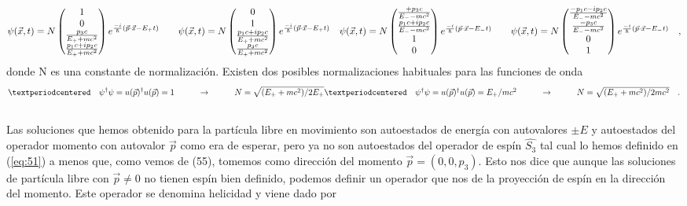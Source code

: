 \documentclass[11pt,letterpaper]{article}     %
\begin{document}
\begin{equation} \label{eq:57}
\psi(\vec{x},t)=N\begin{pmatrix}
1 \\ 0 \\ \frac{p_3 c}{E_+ + mc^2} \\ \frac{p_1 c + ip_2 c}{E_+ + mc^2}
\end{pmatrix} e^{\frac{-i}{\hbar}(\vec{p}\cdot \vec{x}- E_+ t)} \qquad
\psi(\vec{x},t)=N\begin{pmatrix}
0 \\ 1  \\ \frac{p_1 c + ip_2 c}{E_+ + mc^2}\\ \frac{p_3 c}{E_+ + mc^2}
\end{pmatrix} e^{\frac{-i}{\hbar}(\vec{p} \cdot \vec{x}- E_+ t)} \quad $$\\$$
\psi(\vec{x},t)=N\begin{pmatrix}
\frac{+p_3 c}{E_- - mc^2} \\ \frac{p_1 c+ip_2 c}{E_- - mc^2}  \\ 1\\ 0
\end{pmatrix} e^{\frac{-i}{\hbar}(\vec{p} \cdot \vec{x} - E_- t)} \qquad
\psi(\vec{x},t)=N\begin{pmatrix}
\frac{-p_1 c- ip_2 c}{E_- - mc^2}\\ \frac{-p_3 c}{E_- - mc^2} \\ 0 \\ 1  
\end{pmatrix} e^{\frac{-i}{\hbar}(\vec{p} \cdot \vec{x} - E_- t)} \quad ,
\end{equation}
donde N es una constante de normalización. Existen dos posibles normalizaciones habituales para las funciones de onda \\
\begin{equation} \label{eq:58}
· \quad \psi^\dagger \psi =u(\vec{p})^\dagger u(\vec{p})=1 \hspace{1cm} \rightarrow \hspace{1cm} N=\sqrt{(E_+ + mc^2)/2E_+} $$\\$$
· \quad \psi^\dagger \psi = u(\vec{p})^\dagger u(\vec{p})= E_+ /mc^2 \hspace{1cm} \rightarrow \hspace{1cm} N=\sqrt{(E_+ + mc^2)/ 2mc^2} \quad.
\end{equation} \\
Las soluciones que hemos obtenido para la partícula libre en movimiento son autoestados de energía con autovalores $\pm E$ y autoestados del operador momento con autovalor $\vec{p}$ como era de esperar, pero ya no son autoestados del operador de espín $\hat{S_3}$ tal cual lo hemos definido en (\ref{eq:51}) a menos que, como vemos de (55), tomemos como dirección del momento $\vec{p}=(0,0,p_3)$. Esto nos dice que aunque las soluciones de partícula libre con $\vec{p}\neq 0$ no tienen espín bien definido, podemos definir un operador que nos de la proyección de espín en la dirección del momento. Este operador se denomina helicidad y viene dado por
\end{document}
